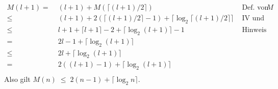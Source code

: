 \documentclass[12pt]{article}
\begin{document}
\begin{enumerate}
\begin{align*}
      M(l+1)     =     &\;         (l+1) + M(\lceil (l+1) / 2 \rceil)                                                                    & \text{ Def. von } M \\
                      \leq &\;     (l+1) + 2 (\lceil(l+1) /2 \rceil -1) + \lceil \log_2 \lceil (l+1) / 2 \rceil \rceil         &  \text{ IV und (*) } \\
                      \leq &\;      l + 1 + \lceil l +1 \rceil - 2 +   \lceil \log_2 (l+1) \rceil - 1                                &  \text{ Hinweis}  \\
                      =    &\;       2 l -1 + \lceil \log_2 (l+1) \rceil &\\
                      \leq    &\; 2 l + \lceil \log_2 (l+1) \rceil &\\
                      =    &\; 2 ((l+1)-1) + \lceil \log_2 (l+1) \rceil &\\
  \end{align*}   
Also gilt $M(n) \;  \leq \;   2 (n-1) + \lceil \log_2 n \rceil$.





\end{enumerate}
\end{document}
